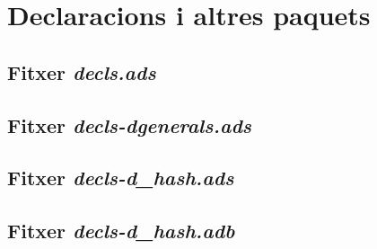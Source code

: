 \section{Declaracions i altres paquets}

\subsection{Fitxer \emph{decls.ads}}

\newpage

\subsection{Fitxer \emph{decls-dgenerals.ads}}

\newpage

\subsection{Fitxer \emph{decls-d\_hash.ads}}

\newpage

\subsection{Fitxer \emph{decls-d\_hash.adb}}

\newpage
